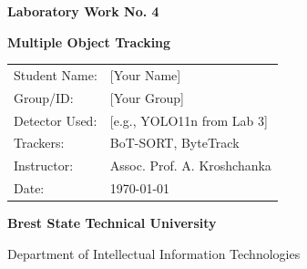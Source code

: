 \documentclass[12pt, a4paper]{article}
\begin{document}
\begin{titlepage}
    \centering
    \vspace*{2cm}
    
    {\Huge \bfseries \textcolor{primary}{Laboratory Work No. 4} \par}
    \vspace{0.5cm}
    {\LARGE \textbf{Multiple Object Tracking} \par}
    \vspace{2cm}
    
    \begin{table}[h]
        \centering
        \large
        \renewcommand{\arraystretch}{1.5}
        \begin{tabular}{l l}
            Student Name: & [Your Name] \\
            Group/ID: & [Your Group] \\
            Detector Used: & [e.g., YOLO11n from Lab 3] \\
            Trackers: & BoT-SORT, ByteTrack \\
            Instructor: & Assoc. Prof. A. Kroshchanka \\
            Date: & \today \\
        \end{tabular}
    \end{table}
    
    \vfill
    {\large \textbf{Brest State Technical University} \par}
    {\large Department of Intellectual Information Technologies \par}
    \vspace*{2cm}
\end{titlepage}

\begin{abstract}
    \noindent This report explores the application of multiple object tracking algorithms using a custom-trained object detector. Using the Ultralytics YOLO framework, tracking algorithms such as BoT-SORT and ByteTrack are implemented and applied to video sequences. The study investigates how modifying parameters within tracking configuration files affects track stability and identifier (ID) consistency. Tracking logic is evaluated using real-world videos sourced from the Internet that contain the objects classified during the previous laboratory work.
\end{abstract}
\end{document}
